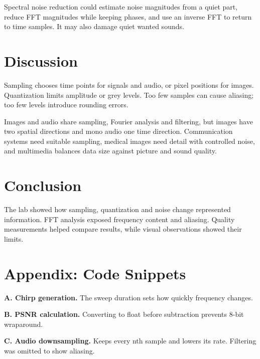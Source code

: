 \documentclass[11pt,a4paper]{article}
\begin{document}
Spectral noise reduction could estimate noise magnitudes from a quiet part,
reduce FFT magnitudes while keeping phases, and use an inverse FFT to return
to time samples. It may also damage quiet wanted sounds.

\section{Discussion}
Sampling chooses time points for signals and audio, or pixel positions for
images. Quantization limits amplitude or grey levels. Too few samples can cause
aliasing; too few levels introduce rounding errors.

Images and audio share sampling, Fourier analysis and filtering, but images
have two spatial directions and mono audio one time direction. Communication
systems need suitable sampling, medical images need detail with controlled
noise, and multimedia balances data size against picture and sound quality.

\section{Conclusion}
The lab showed how sampling, quantization and noise change represented
information. FFT analysis exposed frequency content and aliasing. Quality
measurements helped compare results, while visual observations showed their limits.

\section*{Appendix: Code Snippets}
\small
\textbf{A. Chirp generation.} The sweep duration sets how quickly frequency changes.


\textbf{B. PSNR calculation.} Converting to float before subtraction prevents 8-bit wraparound.


\textbf{C. Audio downsampling.} Keeps every nth sample and lowers its rate.
Filtering was omitted to show aliasing.

\end{document}

